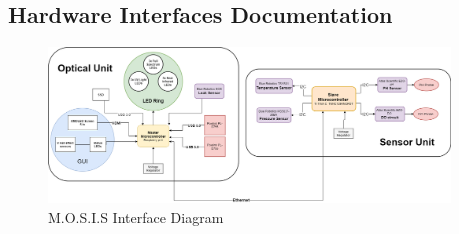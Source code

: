 \subsection{Hardware Interfaces Documentation}
\begin{figure}[H]
  \begin{center}
    \includegraphics[width=0.95\textwidth]{../Appendix/System_Architecture_and_Interfaces/Hardware_Interfaces_Documentation/Figures/interfaces_diagram.png}
  \caption{M.O.S.I.S Interface Diagram}
  \end{center}
\end{figure}